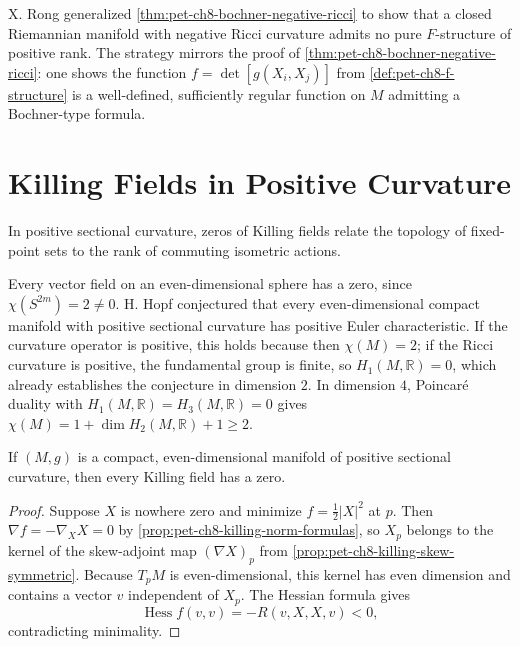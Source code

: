 \begin{remark}
  \label{rem:pet-ch8-rong-f-structure}

  X. Rong generalized \cref{thm:pet-ch8-bochner-negative-ricci} to show that a
  closed Riemannian manifold with negative Ricci curvature admits no pure
  $F$-structure of positive rank. The strategy mirrors the proof of
  \cref{thm:pet-ch8-bochner-negative-ricci}: one shows the function
  $f=\det[g(X_i,X_j)]$ from \cref{def:pet-ch8-f-structure} is a well-defined,
  sufficiently regular function on $M$ admitting a Bochner-type formula.
\end{remark}

\section{Killing Fields in Positive Curvature}

In positive sectional curvature, zeros of Killing fields relate the topology
of fixed-point sets to the rank of commuting isometric actions.

\begin{remark}
  \label{rem:pet-ch8-hopf-conjecture-low-dimensions}

  Every vector field on an even-dimensional sphere has a zero, since
  $\chi(S^{2m})=2\ne0$. H. Hopf conjectured that every even-dimensional compact
  manifold with positive sectional curvature has positive Euler characteristic.
  If the curvature operator is positive, this holds because then
  $\chi(M)=2$; if the Ricci curvature is positive, the fundamental group is
  finite, so $H_1(M,\mathbb{R})=0$, which already establishes the conjecture in
  dimension $2$. In dimension $4$, Poincar\'e duality with $H_1(M,\mathbb{R})=H_3(M,\mathbb{R})=0$
  gives $\chi(M)=1+\dim H_2(M,\mathbb{R})+1\ge2$.
\end{remark}

\begin{theorem}
  \label{thm:pet-ch8-berger-killing-field-zero}

  If $(M,g)$ is a compact, even-dimensional manifold of positive sectional
  curvature, then every Killing field has a zero.
\end{theorem}
\begin{proof}
  \sketch
  Suppose \(X\) is nowhere zero and minimize \(f=\tfrac12|X|^2\) at \(p\).
  Then \(\nabla f=-\nabla_XX=0\) by
  \cref{prop:pet-ch8-killing-norm-formulas}, so \(X_p\) belongs to the kernel of
  the skew-adjoint map \((\nabla X)_p\) from
  \cref{prop:pet-ch8-killing-skew-symmetric}. Because \(T_pM\) is
  even-dimensional, this kernel has even dimension and contains a vector
  \(v\) independent of \(X_p\). The Hessian formula gives
  \[
    \operatorname{Hess}f(v,v)=-R(v,X,X,v)<0,
  \]
  contradicting minimality.
\end{proof}

